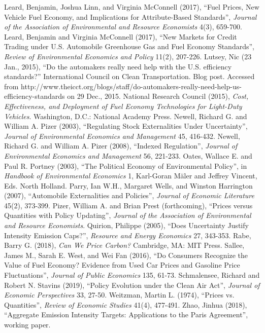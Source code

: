 \documentclass[12pt]{article}
\begin{document}
\begin{thebibliography}{99}
\bibitem{} Leard, Benjamin, Joshua Linn, and Virginia McConnell (2017), ``Fuel Prices, New Vehicle Fuel Economy, and Implications for Attribute-Based Standards'', {\it Journal of the Association of Environmental and Resource Economists} 4(3), 659-700.
\bibitem{} Leard, Benjamin and Virginia McConnell (2017), ``New Markets for Credit Trading under U.S. Automobile Greenhouse Gas and Fuel Economy Standards'', {\it Review of Environmental Economics and Policy} 11(2), 207-226.
\bibitem{} Lutsey, Nic (23 Jan., 2015), ``Do the automakers really need help with the U.S. efficiency standards?'' International Council on Clean Transportation. Blog post. Accessed from http://www.theicct.org/blogs/staff/do-automakers-really-need-help-us-efficiency-standards on 29 Dec., 2015.
\bibitem{} National Research Council (2015), {\it Cost, Effectiveness, and Deployment of Fuel Economy Technologies for Light-Duty Vehicles}. Washington, D.C.: National Academy Press.
\bibitem{} Newell, Richard G. and William A. Pizer (2003), ``Regulating Stock Externalities Under Uncertainty'', {\it Journal of Environmental Economics and Management} 45, 416-432.
\bibitem{} Newell, Richard G. and William A. Pizer (2008), ``Indexed Regulation'', {\it Journal of Environmental Economics and Management} 56, 221-233.
\bibitem{} Oates, Wallace E. and Paul R. Portney (2003), ``The Political Economy of Environmental Policy'', in {\it Handbook of Environmental Economics} 1, Karl-Goran M{\"a}ler and Jeffrey Vincent, Eds. North Holland.
\bibitem{} Parry, Ian W.H., Margaret Wells, and Winston Harrington (2007), ``Automobile Externalities and Policies'', {\it Journal of Economic Literature} 45(2), 373-399.
\bibitem{} Pizer, William A. and Brian Prest (forthcoming), ``Prices versus Quantities with Policy Updating'', {\it Journal of the Association of Environmental and Resource Economists}.
\bibitem{} Quirion, Philippe (2005), ``Does Uncertainty Justify Intensity Emission Caps?'', {\it Resource and Energy Economics} 27, 343-353.
\bibitem{} Rabe, Barry G. (2018), {\it Can We Price Carbon?} Cambridge, MA: MIT Press.
\bibitem{} Sallee, James M., Sarah E. West, and Wei Fan (2016), ``Do Consumers Recognize the Value of Fuel Economy? Evidence from Used Car Prices and Gasoline Price Fluctuations'', {\it Journal of Public Economics} 135, 61-73.
\bibitem{} Schmalensee, Richard and Robert N. Stavins (2019), ``Policy Evolution under the Clean Air Act'', {\it Journal of Economic Perspectives} 33, 27-50.
\bibitem{} Weitzman, Martin L. (1974), ``Prices vs. Quantities'', {\it Review of Economic Studies} 41(4), 477-491.
\bibitem{} Zhao, Jinhua (2018), ``Aggregate Emission Intensity Targets: Applications to the Paris Agreement'', working paper.

\end{thebibliography}
\end{document}
